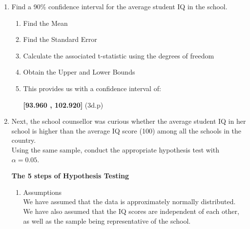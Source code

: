 \documentclass[12pt,letterpaper]{article}
\begin{document}
\begin{enumerate}
	\item Find a 90\% confidence interval for the average student IQ in the school.\\
	
		
	\begin{enumerate}[label=(\alph*)]
		\item Find the Mean
		
			  			
		
		\item Find the Standard Error
					  
					
		\item Calculate the associated t-statistic using the degrees of freedom
					  
					
					
		\item Obtain the Upper and Lower Bounds
					  
					
					  
					
		\item This provides us with a confidence interval of:
		
		\textbf{ [93.960 , 102.920]} (3d.p)
	\end{enumerate}
	
	
	
	
	
	\item Next, the school counsellor was curious  whether  the average student IQ in her school is higher than the average IQ score (100) among all the schools in the country.\\ 
	
	\noindent Using the same sample, conduct the appropriate hypothesis test with $\alpha=0.05$.
	
	
	
\textbf{The 5 steps of Hypothesis Testing}
		\begin{enumerate}[label=(\alph*)]
	
		\item Assumptions\\
				We have assumed that the data is approximately normally distributed.\\
				We have also assumed that the IQ scores are independent of each other, as well as the sample being representative of the school.\\
				

\end{enumerate}
\end{enumerate}
\end{document}
